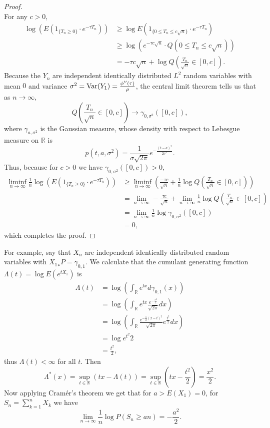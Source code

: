 \documentclass{article}
\newcommand{\Var}{\ensuremath\mathrm{Var}}
\theoremstyle{definition}
\theoremstyle{definition}
\begin{document}
\begin{proof}
\[\]
For any $c>0$, 
\begin{align*}
\log\left( E(1_{\{T_n \geq 0\}} \cdot e^{-\tau T_n})\right) & \geq \log E\left(1_{\{0 \leq T_n \leq c \sqrt{n}\}} \cdot  e^{-\tau T_n} \right)\\
&\geq \log \left( e^{-\tau c\sqrt{n}} \cdot Q\left( 0\leq T_n \leq c\sqrt{n}\right) \right)\\
&=-\tau c \sqrt{n} + \log Q \left( \frac{T_n}{\sqrt{n}} \in [0,c]\right). 
\end{align*}
Because the $Y_n$ are independent  identically distributed $L^2$ random variables
with mean $0$ and variance $\sigma^2=\Var(Y_1)=\frac{\phi''(\tau)}{\rho}$,
the central limit theorem tells
us that  as $n \to \infty$,
\[
Q\left( \frac{T_n}{\sqrt{n}} \in [0,c] \right) \to \gamma_{0,\sigma^2}([0,c]), 
\]
where $\gamma_{a,\sigma^2}$ is the Gaussian measure, whose density with respect to Lebesgue measure on $\mathbb{R}$
is 
\[
p(t,a,\sigma^2)= \frac{1}{\sigma \sqrt{2\pi}} e^{-\frac{(t-a)^2}{2\sigma^2}}.
\]
Thus, because for $c>0$ we have  $\gamma_{0,\sigma^2}([0,c])>0$,
\begin{align*}
\liminf_{n \to \infty} \frac{1}{n} \log\left( E(1_{\{T_n \geq 0\}} \cdot e^{-\tau T_n})\right)
&\geq \liminf_{n \to \infty} \left(\frac{-\tau c}{\sqrt{n}} + \frac{1}{n} \log Q \left( \frac{T_n}{\sqrt{n}} \in [0,c]\right) \right)\\
&=\lim_{n \to \infty} -\frac{\tau c}{\sqrt{n}} + \lim_{n \to \infty} \frac{1}{n} \log Q \left( \frac{T_n}{\sqrt{n}} \in [0,c]\right)\\
&=\lim_{n \to \infty} \frac{1}{n} \log  \gamma_{0,\sigma^2}([0,c])\\
&=0,
\end{align*}
which completes the proof.
\end{proof}


For example, say that $X_n$ are independent identically distributed random variables with
${X_1}_*P=\gamma_{0,1}$. 
We calculate that the cumulant generating function $\Lambda(t)=\log E(e^{tX_1})$ is
\begin{align*}
\Lambda(t)&=\log \left( \int_\mathbb{R} e^{tx} d\gamma_{0,1}(x) \right)\\
&=\log \left(  \int_\mathbb{R} e^{tx} \frac{e^{-\frac{x^2}{2}}}{\sqrt{2\pi}} dx \right)\\
&=\log \left( \int_\mathbb{R} \frac{e^{-\frac{1}{2}(x-t)^2}}{\sqrt{2\pi}} e^{\frac{t^2}{2}}  dx \right)\\
&=\log e^{t^2}{2}\\
&=\frac{t^2}{2},
\end{align*}
thus $\Lambda(t)<\infty$ for all $t$. 
Then
\[
\Lambda^*(x) = \sup_{t \in \mathbb{R}} (tx - \Lambda(t))
=\sup_{t \in \mathbb{R}} \left(tx-\frac{t^2}{2} \right)
=\frac{x^2}{2}.
\]
Now applying Cram\'er's theorem we get that for $a>E(X_1)=0$,
for $S_n=\sum_{k=1}^n X_k$ we have
\[
\lim_{n \to \infty} \frac{1}{n} \log P(S_n \geq an)
=-\frac{a^2}{2}.
\]
\end{document}
